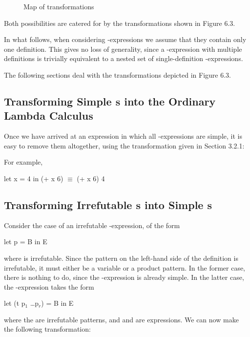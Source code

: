 {\begin{figure}[H]
{	}%
	
	\caption{\textsf Map of  transformations}
\end{figure}

\noindent Both possibilities are catered for by the transformations shown in Figure 6.3.

In what follows, when considering -expressions we assume that they
contain only one definition. This gives no loss of generality, since a -expression with multiple definitions is trivially equivalent to a nested set of
single-definition -expressions.

The following sections deal with the transformations depicted in Figure 6.3.

\subsection{Transforming Simple s into the Ordinary Lambda Calculus}

Once we have arrived at an expression in which all -expressions are simple,
it is easy to remove them altogether, using the transformation given in Section
3.2.1:

\noindent For example,
\begin{mlcoded}
	let x = 4 in (+ x 6) $\equiv$ (+ x 6) 4
\end{mlcoded}

\subsection{Transforming Irrefutable s into Simple s}

Consider the case of an irrefutable -expression, of the form
\begin{mlcoded}
	let p = B in E
\end{mlcoded}
where  is irrefutable. Since the pattern on the left-hand side of the definition
is irrefutable, it must either be a variable or a product pattern. In the former
case, there is nothing to do, since the -expression is already simple. In the
latter case, the -expression takes the form
\begin{mlcoded}
	let (t p$_1$ \ldots p$_r$) = B in E
\end{mlcoded}
where the  are irrefutable patterns, and  and  are expressions. We can now
make the following transformation:

}
